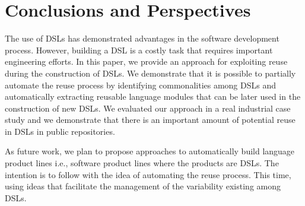 \section{Conclusions and Perspectives}
\label{sec:conclusions}

The use of DSLs has demonstrated advantages in the software development process. However, building a DSL is a costly task that requires important engineering efforts. In this paper, we provide an approach for exploiting reuse during the construction of DSLs. We demonstrate that it is possible to partially automate the reuse process by identifying commonalities among DSLs and automatically extracting reusable language modules that can be later used in the construction of new DSLs. We evaluated our approach in a real industrial case study and we demonstrate that there is an important amount of potential reuse in DSLs in public repositories.

As future work, we plan to propose approaches to automatically build language product lines i.e., software product lines where the products are DSLs. The intention is to follow with the idea of automating the reuse process. This time, using ideas that facilitate the management of the variability existing among DSLs. 